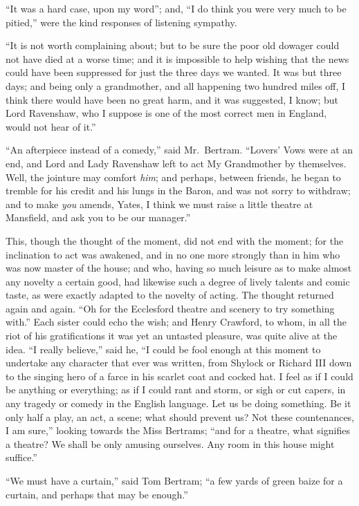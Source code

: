 ``It was a hard case, upon my word''; and, ``I do think you
were very much to be pitied,'' were the kind responses
of listening sympathy.

``It is not worth complaining about; but to be sure the
poor old dowager could not have died at a worse time;
and it is impossible to help wishing that the news could
have been suppressed for just the three days we wanted.
It was but three days; and being only a grandmother,
and all happening two hundred miles off, I think there would
have been no great harm, and it was suggested, I know;
but Lord Ravenshaw, who I suppose is one of the most correct
men in England, would not hear of it.''

``An afterpiece instead of a comedy,'' said Mr.\ Bertram.
``Lovers' Vows were at an end, and Lord and Lady Ravenshaw
left to act My Grandmother by themselves.  Well, the jointure
may comfort \emph{him}; and perhaps, between friends, he began
to tremble for his credit and his lungs in the Baron,
and was not sorry to withdraw; and to make \emph{you} amends,
Yates, I think we must raise a little theatre at Mansfield,
and ask you to be our manager.''

This, though the thought of the moment, did not end
with the moment; for the inclination to act was awakened,
and in no one more strongly than in him who was now
master of the house; and who, having so much leisure
as to make almost any novelty a certain good, had likewise
such a degree of lively talents and comic taste,
as were exactly adapted to the novelty of acting.
The thought returned again and again.  ``Oh for the
Ecclesford theatre and scenery to try something with.''
Each sister could echo the wish; and Henry Crawford,
to whom, in all the riot of his gratifications it was
yet an untasted pleasure, was quite alive at the idea.
``I really believe,'' said he, ``I could be fool enough
at this moment to undertake any character that ever
was written, from Shylock or Richard III down to the singing
hero of a farce in his scarlet coat and cocked hat.
I feel as if I could be anything or everything;
as if I could rant and storm, or sigh or cut capers,
in any tragedy or comedy in the English language.  Let us
be doing something.  Be it only half a play, an act, a scene;
what should prevent us?  Not these countenances, I am sure,''
looking towards the Miss Bertrams; ``and for a theatre,
what signifies a theatre?  We shall be only amusing ourselves.
Any room in this house might suffice.''

``We must have a curtain,'' said Tom Bertram; ``a few yards
of green baize for a curtain, and perhaps that may be enough.''

